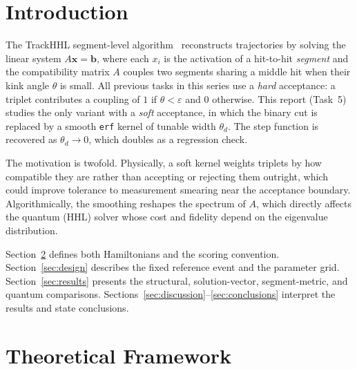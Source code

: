 \documentclass[11pt,a4paper]{article}
\newcommand{\eps}{\varepsilon}
\newcommand{\thd}{\theta_d}
\begin{document}
\tableofcontents
\newpage

\section{Introduction}
\label{sec:intro}

The TrackHHL segment-level algorithm~\cite{onebqf} reconstructs trajectories by solving
the linear system $A\mathbf{x}=\mathbf{b}$, where each $x_i$ is the activation of a
hit-to-hit \emph{segment} and the compatibility matrix $A$ couples two segments sharing a
middle hit when their kink angle $\theta$ is small. All previous tasks in this series use
a \emph{hard} acceptance: a triplet contributes a coupling of $1$ if $\theta<\eps$ and $0$
otherwise. This report (Task~5) studies the only variant with a \emph{soft} acceptance,
in which the binary cut is replaced by a smooth \texttt{erf} kernel of tunable width
$\thd$. The step function is recovered as $\thd\to0$, which doubles as a regression check.

The motivation is twofold. Physically, a soft kernel weights triplets by how compatible
they are rather than accepting or rejecting them outright, which could improve tolerance
to measurement smearing near the acceptance boundary. Algorithmically, the smoothing
reshapes the spectrum of $A$, which directly affects the quantum (HHL) solver whose cost
and fidelity depend on the eigenvalue distribution.

Section~\ref{sec:theory} defines both Hamiltonians and the scoring convention.
Section~\ref{sec:design} describes the fixed reference event and the parameter grid.
Section~\ref{sec:results} presents the structural, solution-vector, segment-metric, and
quantum comparisons. Sections~\ref{sec:discussion}--\ref{sec:conclusions} interpret the
results and state conclusions.

\section{Theoretical Framework}
\label{sec:theory}
\end{document}
